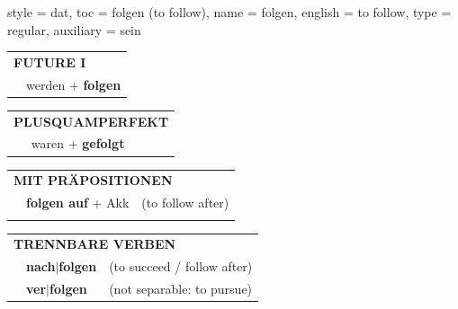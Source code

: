 \begin{verbentry}{
  style = {dat},
  toc = {folgen (to follow)},
  name = {folgen},
  english = {to follow},
  type = {regular},
  auxiliary = {sein}
}
\begin{tabular}{rl}
    \multicolumn{2}{l}{\textbf{FUTURE I} }\\
   & werden + \textbf{folgen}\\
 
  \end{tabular}
\hfill
   \begin{tabular}{rl}
      \multicolumn{2}{l}{\textbf{PLUSQUAMPERFEKT}}\\
   & waren + \textbf{gefolgt}\\
  \end{tabular}

   \vspace{10pt}

   \begin{tabular}{lll}
      \multicolumn{3}{l}{\textbf{MIT PRÄPOSITIONEN}}\\
& \textbf{folgen auf} + Akk & (to follow after)\\
\vspace{10pt}
\end{tabular}
  \hfill
   \begin{tabular}{lll}
      \multicolumn{3}{l}{\textbf{TRENNBARE VERBEN}}\\
 & \textbf{nach$|$folgen} & (to succeed / follow after)\\
 & \textbf{ver$|$folgen} & (not separable: to pursue)\\
  \end{tabular}


  \vspace{-5pt}
\end{verbentry}

